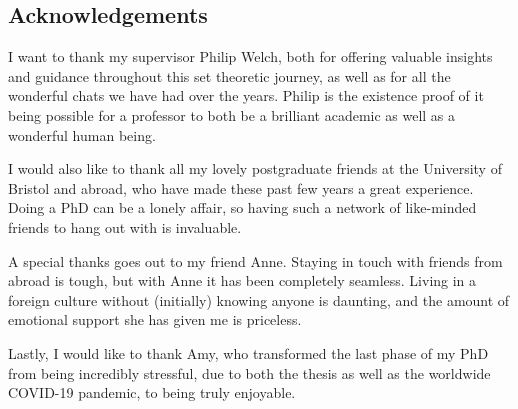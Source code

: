 \documentclass[../main]{subfiles}
\begin{document}
\newpage
\thispagestyle{fancy}
\setlength{\parindent}{10pt}

\begin{onehalfspacing}

  \vspace*{75pt}

  \section*{\huge Acknowledgements}
  I want to thank my supervisor Philip Welch, both for offering valuable insights and guidance throughout this set theoretic journey, as well as for all the wonderful chats we have had over the years. Philip is the existence proof of it being possible for a professor to both be a brilliant academic as well as a wonderful human being.

  I would also like to thank all my lovely postgraduate friends at the University of Bristol and abroad, who have made these past few years a great experience. Doing a PhD can be a lonely affair, so having such a network of like-minded friends to hang out with is invaluable.

  A special thanks goes out to my friend Anne. Staying in touch with friends from abroad is tough, but with Anne it has been completely seamless. Living in a foreign culture without (initially) knowing anyone is daunting, and the amount of emotional support she has given me is priceless.

  Lastly, I would like to thank Amy, who transformed the last phase of my PhD from being incredibly stressful, due to both the thesis as well as the worldwide COVID-19 pandemic, to being truly enjoyable.

\end{onehalfspacing}
\end{document}
